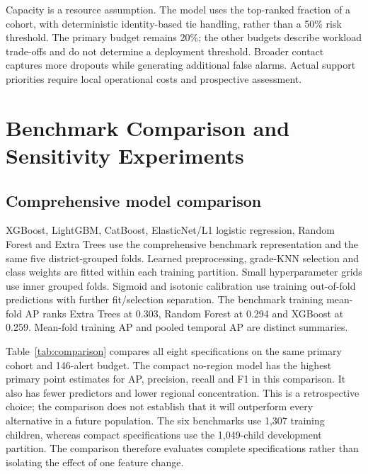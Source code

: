 \documentclass[conference,a4paper]{IEEEtran}
\begin{document}
Capacity is a resource assumption. The model uses the top-ranked fraction of a cohort, with deterministic identity-based tie handling, rather than a 50\% risk threshold. The primary budget remains 20\%; the other budgets describe workload trade-offs and do not determine a deployment threshold. Broader contact captures more dropouts while generating additional false alarms. Actual support priorities require local operational costs and prospective assessment.

\section{\textbf{Benchmark Comparison and Sensitivity Experiments}}
\subsection{\textbf{Comprehensive model comparison}}
XGBoost, LightGBM, CatBoost, ElasticNet/L1 logistic regression, Random Forest and Extra Trees use the comprehensive benchmark representation and the same five district-grouped folds. Learned preprocessing, grade-KNN selection and class weights are fitted within each training partition. Small hyperparameter grids use inner grouped folds. Sigmoid and isotonic calibration use training out-of-fold predictions with further fit/selection separation. The benchmark training mean-fold AP ranks Extra Trees at 0.303, Random Forest at 0.294 and XGBoost at 0.259. Mean-fold training AP and pooled temporal AP are distinct summaries.

Table~\ref{tab:comparison} compares all eight specifications on the same primary cohort and 146-alert budget. The compact no-region model has the highest primary point estimates for AP, precision, recall and F1 in this comparison. It also has fewer predictors and lower regional concentration. This is a retrospective choice; the comparison does not establish that it will outperform every alternative in a future population. The six benchmarks use 1,307 training children, whereas compact specifications use the 1,049-child development partition. The comparison therefore evaluates complete specifications rather than isolating the effect of one feature change.
\end{document}
